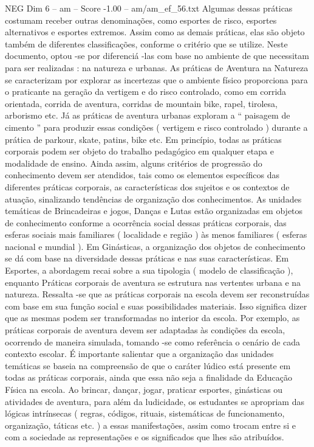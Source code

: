 \begin{textsample}{NEG Dim 6 – am – Score -1.00 – am/am\_ef\_56.txt}
Algumas dessas práticas costumam receber outras denominações, como esportes de risco, esportes alternativos e esportes extremos.
Assim como as demais práticas, elas são objeto também de diferentes classificações, conforme o critério que se utilize.
Neste documento, optou -se por diferenciá -las com base no ambiente de que necessitam para ser realizadas : na natureza e urbanas.
As práticas de Aventura na Natureza se caracterizam por explorar as incertezas que o ambiente físico proporciona para o praticante na geração da vertigem e do risco controlado, como em corrida orientada, corrida de aventura, corridas de mountain bike, rapel, tirolesa, arborismo etc.
Já as práticas de aventura urbanas exploram a “ paisagem de cimento ” para produzir essas condições ( vertigem e risco controlado ) durante a prática de parkour, skate, patins, bike etc.
Em princípio, todas as práticas corporais podem ser objeto do trabalho pedagógico em qualquer etapa e modalidade de ensino.
Ainda assim, alguns critérios de progressão do conhecimento devem ser atendidos, tais como os elementos específicos das diferentes práticas corporais, as características dos sujeitos e os contextos de atuação, sinalizando tendências de organização dos conhecimentos.
As unidades temáticas de Brincadeiras e jogos, Danças e Lutas estão organizadas em objetos de conhecimento conforme a ocorrência social dessas práticas corporais, das esferas sociais mais familiares ( localidade e região ) às menos familiares ( esferas nacional e mundial ).
Em Ginásticas, a organização dos objetos de conhecimento se dá com base na diversidade dessas práticas e nas suas características.
Em Esportes, a abordagem recai sobre a sua tipologia ( modelo de classificação ), enquanto Práticas corporais de aventura se estrutura nas vertentes urbana e na natureza.
Ressalta -se que as práticas corporais na escola devem ser reconstruídas com base em sua função social e suas possibilidades materiais.
Isso significa dizer que as mesmas podem ser transformadas no interior da escola.
Por exemplo, as práticas corporais de aventura devem ser adaptadas às condições da escola, ocorrendo de maneira simulada, tomando -se como referência o cenário de cada contexto escolar.
É importante salientar que a organização das unidades temáticas se baseia na compreensão de que o caráter lúdico está presente em todas as práticas corporais, ainda que essa não seja a finalidade da Educação Física na escola.
Ao brincar, dançar, jogar, praticar esportes, ginásticas ou atividades de aventura, para além da ludicidade, os estudantes se apropriam das lógicas intrínsecas ( regras, códigos, rituais, sistemáticas de funcionamento, organização, táticas etc. ) a essas manifestações, assim como trocam entre si e com a sociedade as representações e os significados que lhes são atribuídos.

\end{textsample}

